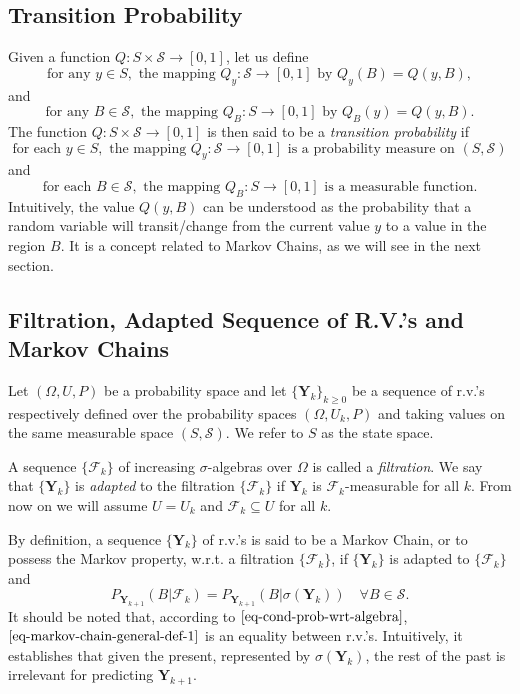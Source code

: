 \subsection{Transition Probability}

Given a function $Q:S\times\mathcal{S}\rightarrow [0,1]$, let us define
\begin{equation*}
\mbox{for any }y\in S,\mbox{ the mapping }Q_y:\mathcal{S}\rightarrow [0,1]\mbox{ by }Q_y(B)=Q(y,B),
\end{equation*}
and
\begin{equation*}
\mbox{for any }B\in\mathcal{S},\mbox{ the mapping }Q_B:S\rightarrow [0,1]\mbox{ by }Q_B(y)=Q(y,B).
\end{equation*}
The function $Q:S\times\mathcal{S}\rightarrow [0,1]$ is then said to be a {\it transition probability} if
\begin{equation*}
\mbox{for each }y\in S,\mbox{ the mapping }Q_y:\mathcal{S}\rightarrow [0,1]\mbox{ is a probability measure on }(S,\mathcal{S})
\end{equation*}
and
\begin{equation*}
\mbox{for each }B\in\mathcal{S},\mbox{ the mapping }Q_B:S\rightarrow [0,1]\mbox{ is a measurable function}.
\end{equation*}
Intuitively, the value $Q(y,B)$ can be understood as
the probability that a random variable will transit/change from the current value $y$ to a value in the region $B$.
It is a concept related to Markov Chains, as we will see in the next section.

\subsection{Filtration, Adapted Sequence of R.V.'s and Markov Chains}

Let $(\Omega,U,P)$ be a probability space and
let $\{\mathbf{Y}_k\}_{k\geqslant 0}$ be a sequence of r.v.'s
respectively defined over the probability spaces $(\Omega,U_k,P)$ and
taking values on the same measurable space $(S,\mathcal{S})$.
We refer to $S$ as the state space.

A sequence $\{\mathcal{F}_k\}$ of increasing $\sigma$-algebras over $\Omega$ is called a {\it filtration}.
We say that $\{\mathbf{Y}_k\}$ is {\it adapted} to the filtration $\{\mathcal{F}_k\}$ if $\mathbf{Y}_k$ is $\mathcal{F}_k$-measurable for all $k$.
From now on we will assume $U=U_k$ and $\mathcal{F}_k\subseteq U$ for all $k$.

By definition, a sequence $\{\mathbf{Y}_k\}$ of r.v.'s is said to be a Markov Chain, or to possess the Markov property, w.r.t. a filtration $\{\mathcal{F}_k\}$,
if $\{\mathbf{Y}_k\}$ is adapted to $\{\mathcal{F}_k\}$ and
\begin{equation}\label{eq-markov-chain-general-def-1}
P_{\mathbf{Y}_{k+1}}(B|\mathcal{F}_k) = P_{\mathbf{Y}_{k+1}}(B|\sigma(\mathbf{Y}_k))\quad\forall B\in\mathcal{S}.
\end{equation}
It should be noted that, according to $\eqref{eq-cond-prob-wrt-algebra}$, $\eqref{eq-markov-chain-general-def-1}$ is an equality between r.v.'s.
Intuitively, it establishes that given the present, represented by $\sigma(\mathbf{Y}_k)$,
the rest of the past is irrelevant for predicting $\mathbf{Y}_{k+1}$.

